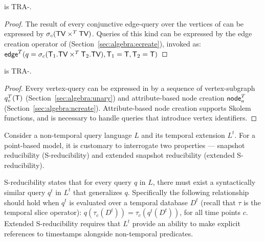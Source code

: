 \begin{theorem}
\tga is TRA-\edgec.
\label{th:edgecomplete}
\end{theorem}

\begin{proof}
  The result of every conjunctive edge-query over the vertices of \ttt
  can be expressed by $\sigma_{c} (\textsf{TV} \times^T \textsf{TV})$.  Queries of
  this kind can be expressed by the edge creation operator of \tga
  (Section~\ref{sec:algebra:ecreate}), invoked as:\\
  $\textsf{edge}^T(q=\sigma_{c} (\mathsf{T}_1.\textsf{TV} \times^T \mathsf{T}_2.\textsf{TV}),\mathsf{T}_1
  = \mathsf{T},\mathsf{T}_2=\mathsf{T})$\end{proof}



\begin{theorem}
\tga is TRA-\vertexc.
\label{th:vertexcomplete}
\end{theorem}

\begin{proof}
  Every \tra vertex-query can be expressed in \tga
  by a sequence of vertex-subgraph $q^T_v(\mathsf{T})$
  (Section~\ref{sec:algebra:unary}) and attribute-based node creation
  $\textsf{node}^T_a$ (Section~\ref{sec:algebra:ncreate}).
  Attribute-based node creation supports Skolem functions, and is
  necessary to handle queries that introduce vertex identifiers.  
\end{proof}


Consider a non-temporal query language $L$ and its temporal extension
$L^t$.  For a point-based model, it is customary to interrogate two
properties --- snapshot reducibility (S-reducibility) and extended
snapshot reducibility (extended S-reducibility).

S-reducibility states that for every query $q$ in $L$, there must
exist a syntactically similar query $q^t$ in $L^t$ that generalizes
$q$.  Specifically the following relationship should hold when $q^t$
is evaluated over a temporal database $D^t$ (recall that $\tau$ is the
temporal slice operator): $q(\tau_c(D^t)) = \tau_c(q^t(D^t))$, for all
time points $c$.  Extended S-reducibility requires that $L^t$ provide
an ability to make explicit references to timestamps alongside
non-temporal predicates.

